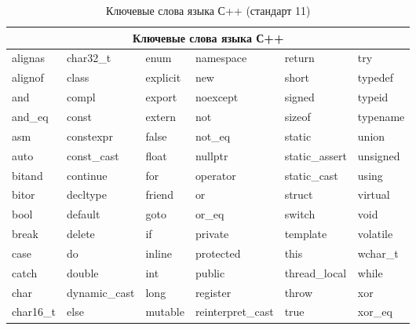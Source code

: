 \begin{table}[ht]
\caption{ Ключевые слова языка С++ (стандарт 11) }
\label{tab:3}
\begin{center}
\begin{tabularx}{\linewidth}{|X|X|X|X|X|X|}
\hline
\multicolumn{6}{|c|}{Ключевые слова языка С++} \\
\hline
alignas & char32\_t & enum & namespace & return & try\\
alignof & class & explicit & new & short & typedef\\
and & compl & export & noexcept & signed & typeid\\
and\_eq & const & extern & not & sizeof & typename\\
asm & constexpr & false & not\_eq & static & union\\
auto & const\_cast & float & nullptr & static\_assert & unsigned\\
bitand & continue & for & operator & static\_cast & using\\
bitor & decltype & friend & or & struct & virtual\\
bool & default & goto & or\_eq & switch & void\\
break & delete & if & private & template & volatile\\
case & do & inline & protected & this & wchar\_t\\
catch & double & int & public & thread\_local & while\\
char & dynamic\_cast & long & register & throw & xor\\
char16\_t & else & mutable & reinterpret\_cast & true & xor\_eq\\
\hline
\end{tabularx}
\end{center}
\end{table}
